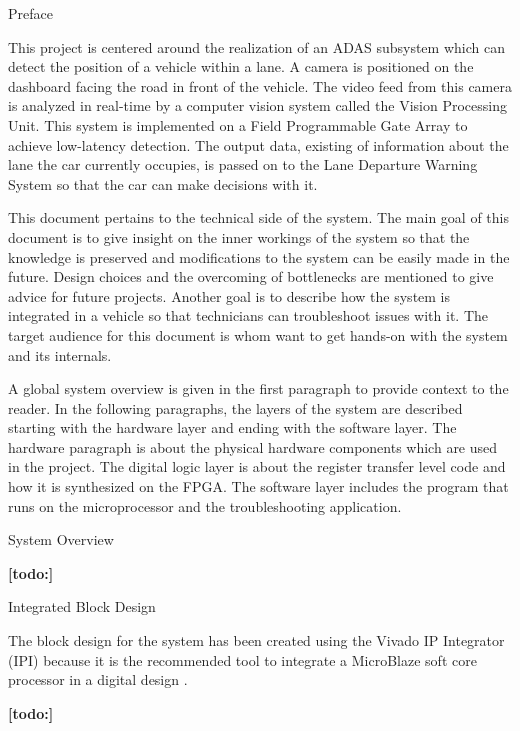 \documentclass{matthijs}
\begin{document}
	\begin{hoofdstuk}{Preface}

		This project is centered around the realization of an ADAS subsystem which can detect the position of a vehicle within a lane.
		A camera is positioned on the dashboard facing the road in front of the vehicle.
		The video feed from this camera is analyzed in real-time by a computer vision system called the Vision Processing Unit.
		This system is implemented on a Field Programmable Gate Array to achieve low-latency detection.
		The output data, existing of information about the lane the car currently occupies, is passed on to the Lane Departure Warning System so that the car can make decisions with it.

		\bigskip

		This document pertains to the technical side of the system.
		The main goal of this document is to give insight on the inner workings of the system so that the knowledge is preserved and modifications to the system can be easily made in the future.
		Design choices and the overcoming of bottlenecks are mentioned to give advice for future projects.
		Another goal is to describe how the system is integrated in a vehicle so that technicians can troubleshoot issues with it.
		The target audience for this document is whom want to get hands-on with the system and its internals.

		\bigskip

		A global system overview is given in the first paragraph to provide context to the reader.
		In the following paragraphs, the layers of the system are described starting with the hardware layer and ending with the software layer.
		The hardware paragraph is about the physical hardware components which are used in the project.
		The digital logic layer is about the register transfer level code and how it is synthesized on the FPGA.
		The software layer includes the program that runs on the microprocessor and the troubleshooting application.

	\end{hoofdstuk}

	\begin{hoofdstuk}{System Overview}

		\textbf{[todo:]}

	\end{hoofdstuk}

	\begin{hoofdstuk}{Integrated Block Design}

		The block design for the system has been created using the Vivado IP Integrator (IPI) because it is the recommended tool to integrate a MicroBlaze soft core processor in a digital design \cite{xilinx2018designing}.

		\textbf{[todo:]}

	\end{hoofdstuk}
\end{document}
